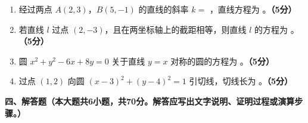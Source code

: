 \documentclass[12pt, a4paper]{ctexart}
\newcommand{\score}[1]{\hfill\textbf{（#1分）}}
\begin{document}
\begin{enumerate}[resume]
\item 经过两点 $A(2,3)$，$B(5,-1)$ 的直线的斜率 $k=$ \underline{\hspace{2cm}}，直线方程为 \underline{\hspace{4cm}}。\score{5}

\item 若直线 $l$ 过点 $(2,-3)$，且在两坐标轴上的截距相等，则直线 $l$ 的方程为 \underline{\hspace{5cm}}。\score{5}

\item 圆 $x^2+y^2-6x+8y=0$ 关于直线 $y=x$ 对称的圆的方程为 \underline{\hspace{5cm}}。\score{5}

\item 过点 $(1,2)$ 向圆 $(x-3)^2+(y-4)^2=1$ 引切线，切线长为 \underline{\hspace{2cm}}。\score{5}
\end{enumerate}

\vspace{1em}

\noindent\textbf{四、解答题（本大题共6小题，共70分。解答应写出文字说明、证明过程或演算步骤。）}

\vspace{0.5em}
\end{document}
